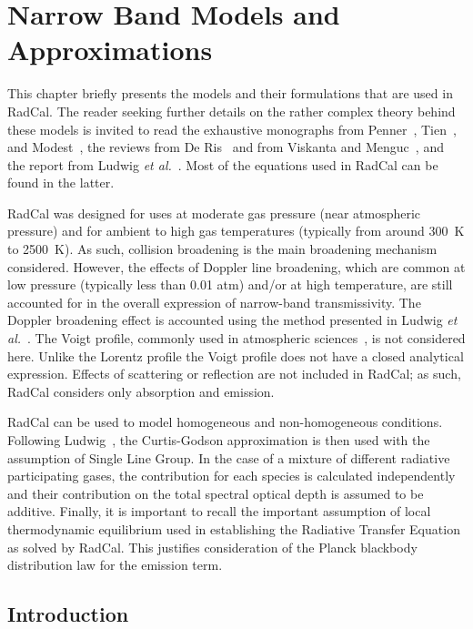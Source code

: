 

\chapter{Narrow Band Models and Approximations}
\label{chap:SNB}

This chapter briefly presents the models and their formulations that are used in RadCal. The reader seeking further details on the rather complex theory behind these models is invited to read the exhaustive monographs from Penner~\cite{Penner1959}, Tien~\cite{Tien1968}, and Modest~\cite{Modest2013}, the reviews from De Ris~\cite{DeRis1979} and from Viskanta and Menguc~\cite{vm_87}, and the report from Ludwig \textit{et al.}~\cite{Ludwig1973}. Most of the equations used in RadCal can be found in the latter.

RadCal was designed for uses at moderate gas pressure (near atmospheric pressure) and for ambient to high gas temperatures (typically from around 300~K to 2500~K). As such, collision broadening is the main broadening mechanism considered. However, the effects of Doppler line broadening, which are common at low pressure (typically less than 0.01 atm) and/or at high temperature, are still accounted for in the overall expression of narrow-band transmissivity. The Doppler broadening effect is accounted using the method presented in Ludwig \textit{et al.}~\cite{Ludwig1973}. The Voigt profile, commonly used in atmospheric sciences~\cite{Chu1994}, is not considered here. Unlike the Lorentz profile the Voigt profile does not have a closed analytical expression. Effects of scattering or reflection are not included in RadCal; as such, RadCal considers only absorption and emission.

RadCal can be used to model homogeneous and non-homogeneous conditions. Following Ludwig~\cite{Ludwig1973}, the Curtis-Godson approximation is then used with the assumption of Single Line Group. In the case of a mixture of different radiative participating gases, the contribution for each species is calculated independently and their contribution on the total spectral optical depth is assumed to be additive. Finally, it is important to recall the important assumption of local thermodynamic equilibrium used in establishing the Radiative Transfer Equation as solved by RadCal. This justifies consideration of the Planck blackbody distribution law for the emission term.

\section{Introduction}

